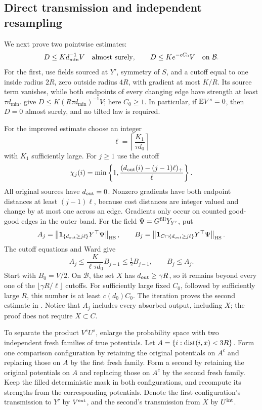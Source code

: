 \subsection{Direct transmission and independent resampling}

We next prove two pointwise estimates:
\begin{equation}\label{boot:direct}
 D\le Kd_{\min}^{-1}V\quad\hbox{almost surely},\qquad
 D\le K e^{-c C_0}V\quad\hbox{on }\mathcal B.
\end{equation}
For the first, use fields sourced at \(Y'\), symmetry of \(S\), and a
cutoff equal to one inside radius \(2R\), zero outside radius \(4R\),
with gradient at most \(K/R\). Its source term vanishes, while both
endpoints of every changing edge have strength at least
\(\tau d_{\min}\).  give
\(D\le K(R\tau d_{\min})^{-1}V\); here \(C_0\ge1\).
In particular, if \(\mathbb E V^s=0\), then \(D=0\) almost surely, and no
tilted law is required.

For the improved estimate choose an integer
\[
                 \ell=\left\lceil\frac{K_1}{\tau d_0}\right\rceil
\]
with \(K_1\) sufficiently large. For \(j\ge1\) use the cutoff
\[
 \chi_j(i)=\min\left\{1,
     \frac{(d_{\rm out}(i)-(j-1)\ell)_+}{\ell}\right\}.
\]
All original sources have \(d_{\rm out}=0\). Nonzero gradients have
both endpoint distances at least \((j-1)\ell\), because cost distances
are integer valued and change by at most one across an edge.
Gradients only occur on counted good-good edges in the outer band.
For the field \(\Psi=G^{\rm fill}Y_{Y'}\), put
\[
 A_j=\left\lVert\mathbf 1_{\{d_{\rm out}\ge j\ell\}}Y^\top\Psi\right\rVert_{\rm HS},
 \qquad
 B_j=\left\lVert\mathbf 1_{C\cap\{d_{\rm out}\ge j\ell\}}
                        Y^\top\Psi\right\rVert_{\rm HS}.
\]
The cutoff equations and Ward give
\[
             A_j\le\frac K{\ell\tau d_0}B_{j-1}
                    \le\tfrac12 B_{j-1},\qquad B_j\le A_j.
\]
Start with \(B_0=V/2\). On \(\mathcal B\), the set \(X\) has
\(d_{\rm out}\ge\gamma R\), so it remains beyond every one of the
\(\lfloor\gamma R/\ell\rfloor\) cutoffs. For sufficiently large fixed
\(C_0\), followed by sufficiently large \(R\), this number is at least
\(c(d_0)C_0\). The iteration proves the second estimate in
. Notice that \(A_j\) includes every absorbed output,
including \(X\); the proof does not require \(X\subset C\).

To separate the product \(V^sU^s\), enlarge the probability space with
two independent fresh families of true potentials. Let
\(A=\{i:\operatorname{dist}(i,x)<3R\}\). Form one comparison configuration by
retaining the original potentials on \(A^c\) and replacing those on
\(A\) by the first fresh family. Form a second by retaining the
original potentials on \(A\) and replacing those on \(A^c\) by the
second fresh family. Keep the filled deterministic mask in both
configurations, and recompute its strengths from the corresponding
potentials. Denote the first configuration's transmission to \(Y'\)
by \(V^{\rm ext}\), and the second's transmission from \(X\) by
\(U^{\rm int}\).

